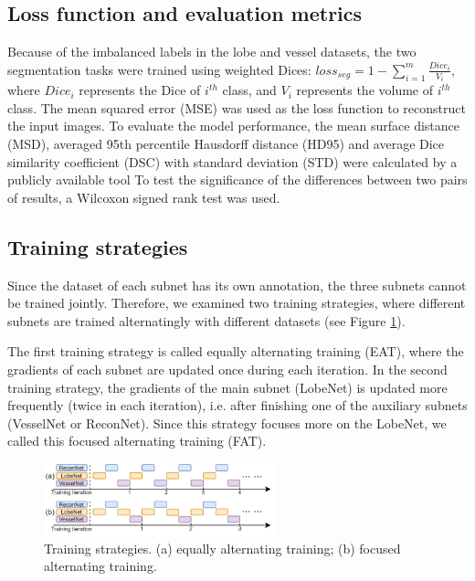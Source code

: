 \subsection{Loss function and evaluation metrics}
Because of the imbalanced labels in the lobe and vessel datasets, the two segmentation tasks were trained using weighted Dices: $loss_{seg} = 1-\sum_{i=1}^{m} \frac{Dice_i}{V_i}$, where $Dice_i$ represents the Dice of $i^{th}$ class, and $V_i$  represents the volume of $i^{th}$ class. The mean squared error (MSE) was used as the loss function to reconstruct the input images. 
To evaluate the model performance, the mean surface distance (MSD), averaged 95th percentile Hausdorff distance (HD95) and average Dice similarity coefficient (DSC) with standard deviation (STD) were calculated by a publicly available tool \cite{jia2020package} To test the significance of the differences between two pairs of results, a Wilcoxon signed rank test was used.

\subsection{Training strategies}
Since the dataset of each subnet has its own annotation, the three subnets cannot be trained jointly. Therefore, we examined two training strategies, where different subnets are trained alternatingly with different datasets (see Figure \ref{fig:chap2_fat}). 

The first training strategy is called equally alternating training (EAT), where the gradients of each subnet are updated once during each iteration. In the second training strategy, the gradients of the main subnet (LobeNet) is updated more frequently (twice in each iteration), i.e. after finishing one of the auxiliary subnets (VesselNet or ReconNet). Since this strategy focuses more on the LobeNet, we called this focused alternating training (FAT).

\begin{figure}[tb]
    \centering
    \includegraphics[width=0.6\textwidth]{fat.png}
    \caption{Training strategies. (a) equally alternating training; (b) focused alternating training.}
    \label{fig:chap2_fat}
\end{figure}

